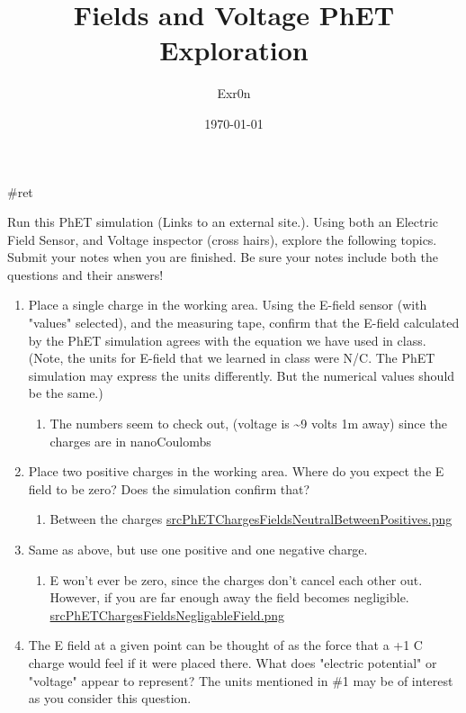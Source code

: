 \documentclass[letterpaper]{article}
\author{Exr0n}
\date{\today}
\title{Fields and Voltage PhET Exploration}
\renewcommand\maketitle{}
\begin{document}
\maketitle
\#ret

Run this PhET simulation (Links to an external site.). Using both an
Electric Field Sensor, and Voltage inspector (cross hairs), explore the
following topics. Submit your notes when you are finished. Be sure your
notes include both the questions and their answers!

\begin{enumerate}
\item Place a single charge in the working area. Using the E-field sensor
(with "values" selected), and the measuring tape, confirm that the
E-field calculated by the PhET simulation agrees with the equation we
have used in class. (Note, the units for E-field that we learned in
class were N/C. The PhET simulation may express the units
differently. But the numerical values should be the same.)

\begin{enumerate}
\item The numbers seem to check out, (voltage is \textasciitilde{}9 volts 1m away) since
the charges are in nanoCoulombs
\end{enumerate}

\item Place two positive charges in the working area. Where do you expect
the E field to be zero? Does the simulation confirm that?

\begin{enumerate}
\item Between the charges
\href{srcPhETChargesFieldsNeutralBetweenPositives.png.org}{srcPhETChargesFieldsNeutralBetweenPositives.png}
\end{enumerate}

\item Same as above, but use one positive and one negative charge.

\begin{enumerate}
\item E won't ever be zero, since the charges don't cancel each other
out. However, if you are far enough away the field becomes
negligible.
\href{srcPhETChargesFieldsNegligableField.png.org}{srcPhETChargesFieldsNegligableField.png}
\end{enumerate}

\item The E field at a given point can be thought of as the force that a +1
C charge would feel if it were placed there. What does "electric
potential" or "voltage" appear to represent? The units mentioned in
\#1 may be of interest as you consider this question.


\end{enumerate}
\end{document}

